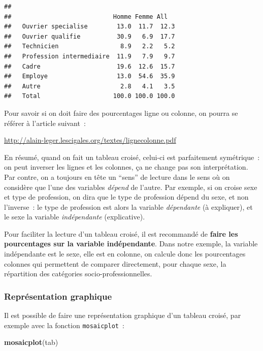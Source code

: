 \documentclass[12pt,]{book}
\makeatletter
\newenvironment{Shaded}{\begin{snugshade}}{\end{snugshade}}
\newcommand{\KeywordTok}[1]{\textcolor[rgb]{0.27,0.27,0.27}{\textbf{#1}}}
\newcommand{\NormalTok}[1]{#1}
\newenvironment{kframe}{%
\medskip{}
\setlength{\fboxsep}{.8em}
 \def\at@end@of@kframe{}%
 \ifinner\ifhmode%
  \def\at@end@of@kframe{\end{minipage}}%
  \begin{minipage}{\columnwidth}%
 \fi\fi%
 \def\FrameCommand##1{\hskip\@totalleftmargin \hskip-\fboxsep
 \colorbox{shadecolor}{##1}\hskip-\fboxsep
     \hskip-\linewidth \hskip-\@totalleftmargin \hskip\columnwidth}%
 \MakeFramed {\advance\hsize-\width
   \@totalleftmargin\z@ \linewidth\hsize
   \@setminipage}}%
 {\par\unskip\endMakeFramed%
 \at@end@of@kframe}
\newenvironment{rmdblock}[1]
  {
  \begin{itemize}
  \renewcommand{\labelitemi}{
    \raisebox{-.7\height}[0pt][0pt]{
      {\setkeys{Gin}{width=3em,keepaspectratio}\texttt{[image: images/\#1]}}
    }
  }
  \setlength{\fboxsep}{1em}
  \begin{kframe}
  \item
  }
  {
  \end{kframe}
  \end{itemize}
  }
\newenvironment{rmdnote}
  {\begin{rmdblock}{note}}
  {\end{rmdblock}}
\makeatother
\begin{document}
\begin{verbatim}
##                           
##                            Homme Femme All  
##   Ouvrier specialise        13.0  11.7  12.3
##   Ouvrier qualifie          30.9   6.9  17.7
##   Technicien                 8.9   2.2   5.2
##   Profession intermediaire  11.9   7.9   9.7
##   Cadre                     19.6  12.6  15.7
##   Employe                   13.0  54.6  35.9
##   Autre                      2.8   4.1   3.5
##   Total                    100.0 100.0 100.0
\end{verbatim}

\begin{rmdnote}
Pour savoir si on doit faire des pourcentages ligne ou colonne, on
pourra se référer à l'article suivant~:

\url{http://alain-leger.lescigales.org/textes/lignecolonne.pdf}

En résumé, quand on fait un tableau croisé, celui-ci est parfaitement
symétrique~: on peut inverser les lignes et les colonnes, ça ne change
pas son interprétation. Par contre, on a toujours en tête un ``sens'' de
lecture dans le sens où on considère que l'une des variables
\emph{dépend} de l'autre. Par exemple, si on croise sexe et type de
profession, on dira que le type de profession dépend du sexe, et non
l'inverse~: le type de profession est alors la variable
\emph{dépendante} (à expliquer), et le sexe la variable
\emph{indépendante} (explicative).

Pour faciliter la lecture d'un tableau croisé, il est recommandé de
\textbf{faire les pourcentages sur la variable indépendante}. Dans notre
exemple, la variable indépendante est le sexe, elle est en colonne, on
calcule donc les pourcentages colonnes qui permettent de comparer
directement, pour chaque sexe, la répartition des catégories
socio-professionnelles.
\end{rmdnote}

\hypertarget{repruxe9sentation-graphique}{%
\subsubsection{Représentation graphique}\label{repruxe9sentation-graphique}}

Il est possible de faire une représentation graphique d'un tableau croisé, par exemple avec la fonction \texttt{mosaicplot}~:

\begin{Shaded}
\begin{Highlighting}[]
\KeywordTok{mosaicplot}\NormalTok{(tab)}
\end{Highlighting}
\end{Shaded}
\end{document}
